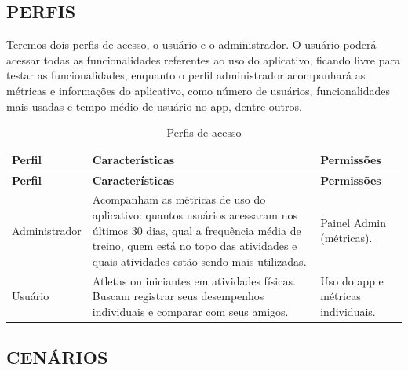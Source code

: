 \subsection{PERFIS}

Teremos dois perfis de acesso, o usuário e o administrador. O usuário poderá acessar todas as funcionalidades referentes ao uso do aplicativo, ficando livre para testar as funcionalidades, enquanto o perfil administrador acompanhará as métricas e informações do aplicativo, como número de usuários, funcionalidades mais usadas e tempo médio de usuário no app, dentre outros.

\begingroup
\small
\setlength{\tabcolsep}{4pt}
\renewcommand{\arraystretch}{1.2}
\begin{longtable}{|>{\raggedright\arraybackslash}p{}|>{\raggedright\arraybackslash}p{}|>{\raggedright\arraybackslash}p{}|}
\caption{Perfis de acesso}\\
\hline
\textbf{Perfil} & \textbf{Características} & \textbf{Permissões} \\ \hline
\endfirsthead
\textbf{Perfil} & \textbf{Características} & \textbf{Permissões} \\ \hline
\endhead
Administrador & Acompanham as métricas de uso do aplicativo: quantos usuários acessaram nos últimos 30 dias, qual a frequência média de treino, quem está no topo das atividades e quais atividades estão sendo mais utilizadas. & Painel Admin (métricas). \\ \hline
Usuário & Atletas ou iniciantes em atividades físicas. Buscam registrar seus desempenhos individuais e comparar com seus amigos. & Uso do app e métricas individuais. \\ \hline
\end{longtable}
\endgroup

\subsection{CENÁRIOS}


